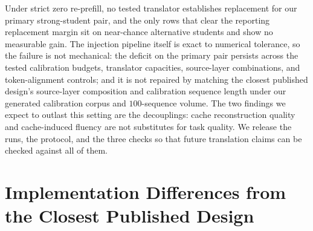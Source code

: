 \documentclass[10pt]{article}
\begin{document}
Under strict zero re-prefill, no tested translator establishes replacement for
our primary strong-student pair, and the only rows that clear the reporting
replacement margin sit on near-chance alternative students and show no
measurable gain. The injection pipeline itself is exact to numerical
tolerance, so the failure is not mechanical: the deficit on the primary pair
persists across the tested calibration
budgets, translator capacities, source-layer combinations, and token-alignment
controls; and it is not repaired by matching the closest published design's
source-layer composition and calibration sequence length under our generated
calibration corpus and $100$-sequence volume. The
two findings we expect to outlast this setting are the decouplings: cache
reconstruction quality and cache-induced fluency are not substitutes for task
quality. We release the runs, the protocol, and the three checks so that future
translation claims can be checked against all of them.





\appendix

\section{Implementation Differences from the Closest Published Design}
\label{app:impl}

\begin{table}[h]
\centering
\caption{Our implementation of the closest strict-zero-re-prefill design
\citep{heo2026} and where it differs from the reference. Both configurations of
our implementation fail (Table~\ref{tab:main}).}
\label{tab:impl}
\end{table}
\end{document}

